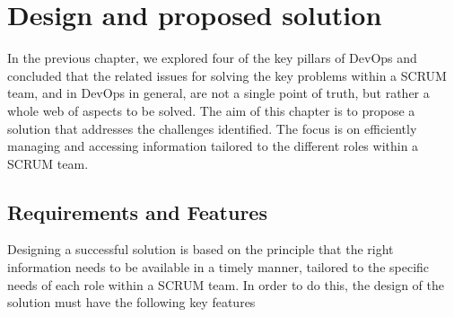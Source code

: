 

\chapter{Design and proposed solution}

\label{Chapter3} %

In the previous chapter, we explored four of the key pillars of DevOps and concluded that the related issues for solving the key problems within a SCRUM team, and in DevOps in general, are not a single point of truth, but rather a whole web of aspects to be solved. The aim of this chapter is to propose a solution that addresses the challenges identified. The focus is on efficiently managing and accessing information tailored to the different roles within a SCRUM team.


\section{Requirements and Features}


Designing a successful solution is based on the principle that the right information needs to be available in a timely manner, tailored to the specific needs of each role within a SCRUM team. In order to do this, the design of the solution must have the following key features

